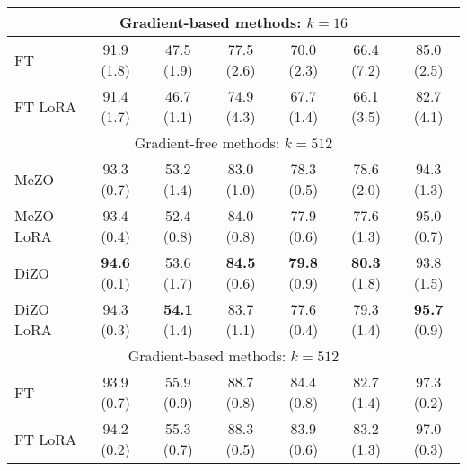 \begin{table*}[htbp]
{\begin{tabular}{lcccccc}
\multicolumn{7}{c}{Gradient-based methods: $k=16$} \rule{0pt}{2.5ex}                                                                                                                                      \\ \hline
FT                                                                        & 91.9 (1.8)           & 47.5 (1.9)           & 77.5 (2.6)    & 70.0 (2.3)    & 66.4 (7.2)   & 85.0 (2.5)    \\
FT LoRA                                                                   & 91.4 (1.7)           & 46.7 (1.1)           & 74.9 (4.3)    & 67.7 (1.4)    & 66.1 (3.5)   & 82.7 (4.1)    \\ \hline \hline
\multicolumn{7}{c}{Gradient-free methods: $k=512$} \rule{0pt}{2.5ex}                                                                                                                                       \\ \hline
MeZO                                                                      & 93.3 (0.7)           & 53.2 (1.4)           & 83.0 (1.0)    & 78.3 (0.5)    & 78.6 (2.0)   & 94.3 (1.3)    \\
MeZO LoRA                                                                 & 93.4 (0.4)           & 52.4 (0.8)           & 84.0 (0.8)    & 77.9 (0.6)    & 77.6 (1.3)   & 95.0 (0.7)    \\
\rowcolor[gray]{.92}DiZO                                                                      & \textbf{94.6} (0.1)           & 53.6 (1.7)           & \textbf{84.5} (0.6)    & \textbf{79.8} (0.9)    & \textbf{80.3} (1.8)   & 93.8 (1.5)    \\
\rowcolor[gray]{.92}DiZO LoRA                                                                 & 94.3 (0.3)           & \textbf{54.1} (1.4)           & 83.7 (1.1)    & 77.6 (0.4)    & 79.3 (1.4)   & \textbf{95.7} (0.9)    \\ \hline
\multicolumn{7}{c}{Gradient-based methods: $k=512$} \rule{0pt}{2.5ex}                                                                                                                                     \\ \hline
FT                                                                        & 93.9 (0.7)           & 55.9 (0.9)           & 88.7 (0.8)    & 84.4 (0.8)    & 82.7 (1.4)   & 97.3 (0.2)    \\
FT LoRA                                                                   & 94.2 (0.2)           & 55.3 (0.7)           & 88.3 (0.5)    & 83.9 (0.6)    & 83.2 (1.3)   & 97.0 (0.3)   \\
\bottomrule
\end{tabular}
}

\label{roberta-main}
\end{table*}
